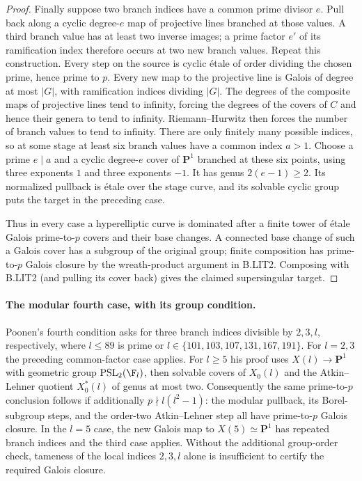 \begin{proof}
Finally suppose two branch indices have a common prime divisor
$e$. Pull back along a cyclic degree-$e$ map of projective lines
branched at those values. A third branch value has at least two
inverse images; a prime factor $e'$ of its ramification index
therefore occurs at two new branch values. Repeat this construction.
Every step on the source is cyclic \'etale of order dividing the
chosen prime, hence prime to $p$. Every new map to the projective
line is Galois of degree at most $|G|$, with ramification indices
dividing $|G|$. The degrees of the composite maps of projective
lines tend to infinity, forcing the degrees of the covers of $C$
and hence their genera to tend to infinity. Riemann--Hurwitz then
forces the number of branch values to tend to infinity. There are
only finitely many possible indices, so at some stage at least six
branch values have a common index $a>1$. Choose a prime $e\mid a$
and a cyclic degree-$e$ cover of $\mathbf P^1$ branched at these
six points, using three exponents $1$ and three exponents $-1$.
It has genus $2(e-1)\ge2$. Its normalized pullback is \'etale
over the stage curve, and its solvable cyclic group puts the target
in the preceding case.

Thus in every case a hyperelliptic curve is dominated after a
finite tower of \'etale Galois prime-to-$p$ covers and their base
changes. A connected base change of such a Galois cover has a
subgroup of the original group; finite composition has prime-to-$p$
Galois closure by the wreath-product argument in B.LIT2. Composing
with B.LIT2 (and pulling its cover back) gives the claimed
supersingular target.
\end{proof}

\paragraph{The modular fourth case, with its group condition.}
Poonen's fourth condition asks for three branch indices divisible
by $2,3,l$, respectively, where $l\le89$ is prime or
$l\in\{101,103,107,131,167,191\}$. For $l=2,3$ the preceding
common-factor case applies. For $l\ge5$ his proof uses
$X(l)\to\mathbf P^1$ with geometric group
$\mathrm{PSL}_2(\F_l)$, then solvable covers of $X_0(l)$ and the
Atkin--Lehner quotient $X_0^*(l)$ of genus at most two.
Consequently the same prime-to-$p$ conclusion follows if additionally
$p\nmid l(l^2-1)$: the modular pullback, its Borel-subgroup steps,
and the order-two Atkin--Lehner step all have prime-to-$p$ Galois
closure. In the $l=5$ case, the new Galois map to $X(5)\simeq
\mathbf P^1$ has repeated branch indices and the third case applies.
Without the additional group-order check, tameness of the local
indices $2,3,l$ alone is insufficient to certify the required
Galois closure.\citep[Lemma~2.3 and \S3.4]{LA_Poonen2005}

